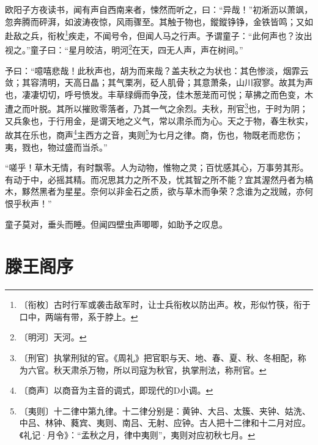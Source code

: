 \documentclass[12pt,UTF-8,openany]{ctexbook}
\begin{document}
\begin{normalsize}
    
    欧阳子方夜读书，闻有声自西南来者，悚然而听之，曰：“异哉！”初淅沥以萧飒，忽奔腾而砰湃，如波涛夜惊，风雨骤至。其触于物也，鏦鏦铮铮，金铁皆鸣；又如赴敌之兵，衔枚\footnote{〔衔枚〕古时行军或袭击敌军时，让士兵衔枚以防出声。枚，形似竹筷，衔于口中，两端有带，系于脖上。}疾走，不闻号令，但闻人马之行声。予谓童子：“此何声也？汝出视之。”童子曰：“星月皎洁，明河\footnote{〔明河〕天河。}在天，四无人声，声在树间。”
    
    予曰：“噫嘻悲哉！此秋声也，胡为而来哉？盖夫秋之为状也：其色惨淡，烟霏云敛；其容清明，天高日晶；其气栗冽，砭人肌骨；其意萧条，山川寂寥。故其为声也，凄凄切切，呼号愤发。丰草绿缛而争茂，佳木葱茏而可悦；草拂之而色变，木遭之而叶脱。其所以摧败零落者，乃其一气之余烈。夫秋，刑官\footnote{〔刑官〕执掌刑狱的官。《周礼》把官职与天、地、春、夏、秋、冬相配，称为六官。秋天肃杀万物，所以司寇为秋官，执掌刑法，称刑官。}也，于时为阴；又兵象也，于行用金，是谓天地之义气，常以肃杀而为心。天之于物，春生秋实，故其在乐也，商声\footnote{〔商声〕以商音为主音的调式，即现代的D小调。}主西方之音，夷则\footnote{〔夷则〕十二律中第九律。十二律分别是：黄钟、大吕、太簇、夹钟、姑洗、中吕、林钟、蕤宾、夷则、南吕、无射、应钟。古人把十二律和十二月对应。《礼记·月令》：“孟秋之月，律中夷则”，夷则对应初秋七月。}为七月之律。商，伤也，物既老而悲伤；夷，戮也，物过盛而当杀。”
    
    “嗟乎！草木无情，有时飘零。人为动物，惟物之灵；百忧感其心，万事劳其形。有动于中，必摇其精。而况思其力之所不及，忧其智之所不能？宜其渥然丹者为槁木，黟然黑者为星星。奈何以非金石之质，欲与草木而争荣？念谁为之戕贼，亦何恨乎秋声！”
    
    童子莫对，垂头而睡。但闻四壁虫声唧唧，如助予之叹息。
\end{normalsize}



\chapter{滕王阁序}
\end{document}
